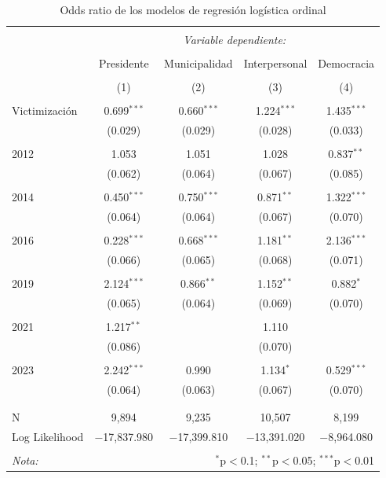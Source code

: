 \documentclass[letterpaper]{article}
\begin{document}
\begin{table}[!htbp] \centering 
  \caption{Odds ratio de los modelos de regresión logística ordinal} 
  \label{} 
\begin{tabular}{@{\extracolsep{5pt}}lcccc} 
\\[-1.8ex]\hline 
\hline \\[-1.8ex] 
 & \multicolumn{4}{c}{\textit{Variable dependiente:}} \\ 
\cline{2-5} 
\\[-1.8ex] & Presidente & Municipalidad & Interpersonal & Democracia \\ 
\\[-1.8ex] & (1) & (2) & (3) & (4)\\ 
\hline \\[-1.8ex] 
 Victimización & 0.699$^{***}$ & 0.660$^{***}$ & 1.224$^{***}$ & 1.435$^{***}$ \\ 
  & (0.029) & (0.029) & (0.028) & (0.033) \\ 
  & & & & \\ 
 2012 & 1.053 & 1.051 & 1.028 & 0.837$^{**}$ \\ 
  & (0.062) & (0.064) & (0.067) & (0.085) \\ 
  & & & & \\ 
 2014 & 0.450$^{***}$ & 0.750$^{***}$ & 0.871$^{**}$ & 1.322$^{***}$ \\ 
  & (0.064) & (0.064) & (0.067) & (0.070) \\ 
  & & & & \\ 
 2016 & 0.228$^{***}$ & 0.668$^{***}$ & 1.181$^{**}$ & 2.136$^{***}$ \\ 
  & (0.066) & (0.065) & (0.068) & (0.071) \\ 
  & & & & \\ 
 2019 & 2.124$^{***}$ & 0.866$^{**}$ & 1.152$^{**}$ & 0.882$^{*}$ \\ 
  & (0.065) & (0.064) & (0.069) & (0.070) \\ 
  & & & & \\ 
 2021 & 1.217$^{**}$ &  & 1.110 &  \\ 
  & (0.086) &  & (0.070) &  \\ 
  & & & & \\ 
 2023 & 2.242$^{***}$ & 0.990 & 1.134$^{*}$ & 0.529$^{***}$ \\ 
  & (0.064) & (0.063) & (0.067) & (0.070) \\ 
  & & & & \\ 
\hline \\[-1.8ex] 
N & 9,894 & 9,235 & 10,507 & 8,199 \\ 
Log Likelihood & $-$17,837.980 & $-$17,399.810 & $-$13,391.020 & $-$8,964.080 \\ 
\hline 
\hline \\[-1.8ex] 
\textit{Nota:}  & \multicolumn{4}{r}{$^{*}$p$<$0.1; $^{**}$p$<$0.05; $^{***}$p$<$0.01} \\ 
\end{tabular} 
\end{table} 
\end{document}
